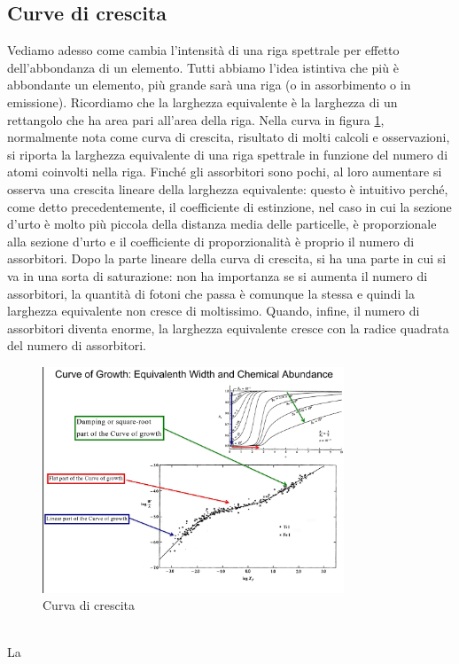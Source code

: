 \documentclass[a4paper,11pt]{article}
\begin{document}
    \subsection{Curve di crescita}
    Vediamo adesso come cambia l'intensità di una riga spettrale per effetto dell'abbondanza di un elemento. Tutti abbiamo l'idea istintiva che più è abbondante un elemento, più grande sarà una riga (o in assorbimento o in emissione). Ricordiamo che la larghezza equivalente è la larghezza di un rettangolo che ha area pari all'area della riga. Nella curva in figura \ref{fig:curva}, normalmente nota come curva di crescita, risultato di molti calcoli e osservazioni, si riporta la larghezza equivalente di una riga spettrale in funzione del numero di atomi coinvolti nella riga. Finché gli assorbitori sono pochi, al loro aumentare si osserva una crescita lineare della larghezza equivalente: questo è intuitivo perché, come detto precedentemente, il coefficiente di estinzione, nel caso in cui la sezione d'urto è molto più piccola della distanza media delle particelle, è proporzionale alla sezione d'urto e il coefficiente di proporzionalità è proprio il numero di assorbitori. Dopo la parte lineare della curva di crescita, si ha una parte in cui si va in una sorta di saturazione: non ha importanza se si aumenta il numero di assorbitori, la quantità di fotoni che passa è comunque la stessa e quindi la larghezza equivalente non cresce di moltissimo. Quando, infine, il numero di assorbitori diventa enorme, la larghezza equivalente cresce con la radice quadrata del numero di assorbitori.\\
\begin{figure}[h!!]
        \centering
        \includegraphics[width=9cm]{curva.jpg}
        \caption{Curva di crescita}
        \label{fig:curva}
    \end{figure}
    \\
La
\end{document}
